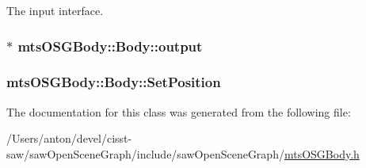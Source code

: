 The input interface. 

\hypertarget{classmts_o_s_g_body_1_1_body_a811a794749b145589bf15a97719166a7}{}
\subsubsection[{output}]{$\ast$ mts\+O\+S\+G\+Body\+::\+Body\+::output}\label{classmts_o_s_g_body_1_1_body_a811a794749b145589bf15a97719166a7}
\hypertarget{classmts_o_s_g_body_1_1_body_a840993fc4f30facfdf722b7f0df04869}{}
\subsubsection[{Set\+Position}]{ mts\+O\+S\+G\+Body\+::\+Body\+::\+Set\+Position}\label{classmts_o_s_g_body_1_1_body_a840993fc4f30facfdf722b7f0df04869}


The documentation for this class was generated from the following file\+:\begin{DoxyCompactItemize}
\item 
/\+Users/anton/devel/cisst-\/saw/saw\+Open\+Scene\+Graph/include/saw\+Open\+Scene\+Graph/\hyperlink{mts_o_s_g_body_8h}{mts\+O\+S\+G\+Body.\+h}\end{DoxyCompactItemize}
